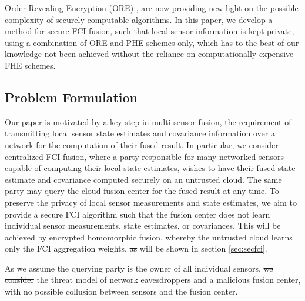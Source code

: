 \documentclass[letterpaper, 10 pt, journal, twoside]{ieeetran}  %
\providecommand{\DIFadd}[1]{{\protect\color{blue}\uwave{#1}}} %
\providecommand{\DIFdel}[1]{{\protect\color{red}\sout{#1}}}                      %
\providecommand{\DIFaddbegin}{} %
\providecommand{\DIFaddend}{} %
\providecommand{\DIFdelbegin}{} %
\providecommand{\DIFdelend}{} %
\begin{document}
Order Revealing Encryption (ORE) \cite{chenettePracticalOrderRevealingEncryption2016,lewiOrderRevealingEncryptionNew2016,bogatovComparativeEvaluationOrderPreserving2018}, are now providing new light on the possible complexity of securely computable algorithms. In this paper, we develop a method for secure FCI fusion, such that local sensor information is kept private, using a combination of ORE and PHE schemes only, which has to the best of our knowledge not been achieved without the reliance on computationally expensive FHE schemes.

\subsection{Problem Formulation} \label{subsec:problem_formulation}
Our paper is motivated by a key step in multi-sensor fusion, the requirement of transmitting local sensor state estimates and covariance information over a network for the computation of their fused result. In particular, we consider centralized FCI fusion, where a party responsible for many networked sensors capable of computing their local state estimates, wishes to have their fused state estimate and covariance computed securely on an untrusted cloud. The same party may query the cloud fusion center for the fused result at any time. To preserve the privacy of local sensor measurements and state estimates, we aim to provide a secure FCI algorithm such that the fusion center does not learn individual sensor measurements, state estimates, or covariances. This will be achieved by encrypted homomorphic fusion, whereby the untrusted cloud learns only the FCI aggregation weights, \DIFdelbegin \DIFdel{as }\DIFdelend \DIFaddbegin \DIFadd{which }\DIFaddend will be shown in section \ref{sec:secfci}.

As we assume the querying party is the owner of all individual sensors, \DIFdelbegin \DIFdel{we consider }\DIFdelend the threat model \DIFaddbegin \DIFadd{to be considered is that }\DIFaddend of network eavesdroppers and a malicious fusion center, with no possible collusion between sensors and the fusion center.
\end{document}
